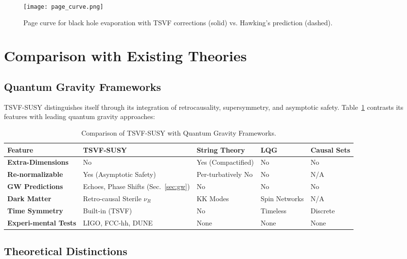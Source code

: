 \documentclass[twocolumn,superscriptaddress,floatfix]{revtex4-2}
\begin{document}
\begin{figure}[t]
\centering
\texttt{[image: page\_curve.png]}
\caption{Page curve for black hole evaporation with TSVF corrections (solid) vs. Hawking’s prediction (dashed).}
\label{fig:page}
\end{figure}



\section{Comparison with Existing Theories}
\label{sec:comparison}

\subsection{Quantum Gravity Frameworks}
\label{subsec:qg_comparison}

TSVF-SUSY distinguishes itself through its integration of retrocausality, supersymmetry, and asymptotic safety. Table~\ref{tab:qg_comparison} contrasts its features with leading quantum gravity approaches:

\begin{table}[ht]
\centering
\caption{Comparison of TSVF-SUSY with Quantum Gravity Frameworks.}
\label{tab:qg_comparison}
\begin{tabular}{p{2.0cm} p{1.5cm} p{1.5cm} p{1.5cm} p{1.5cm}}
\toprule
\textbf{Feature} & \textbf{TSVF-SUSY} & \textbf{String Theory} & \textbf{LQG} & \textbf{Causal Sets} \\
\midrule
\textbf{Extra-Dimensions} & No & Yes (Compactified) & No & No \\
\textbf{Re-normalizable} & Yes (Asymptotic Safety) & Per-turbatively No & No & N/A \\
\textbf{GW Predictions} & Echoes, Phase Shifts (Sec.~\ref{sec:gw}) & No & No & No \\
\textbf{Dark Matter} & Retro-causal Sterile \(\nu_R\) & KK Modes & Spin Networks & N/A \\
\textbf{Time Symmetry} & Built-in (TSVF) & No & Timeless & Discrete \\
\textbf{Experi-mental Tests} & LIGO, FCC-hh, DUNE & None & None & None \\
\bottomrule
\end{tabular}
\end{table}

\subsection{Theoretical Distinctions}
\label{subsec:theory_distinctions}
\end{document}
